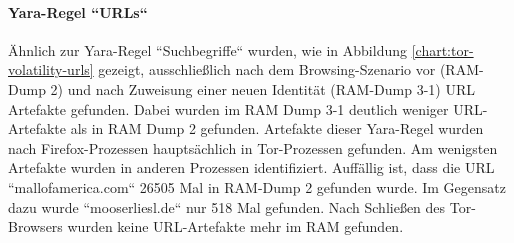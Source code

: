 \paragraph*{Yara-Regel ``URLs``}
Ähnlich zur Yara-Regel ``Suchbegriffe`` wurden, wie in Abbildung \ref{chart:tor-volatility-urls} gezeigt, ausschließlich nach dem Browsing-Szenario vor (RAM-Dump 2) und nach Zuweisung einer neuen Identität (RAM-Dump 3-1) URL Artefakte gefunden. Dabei wurden im RAM Dump 3-1 deutlich weniger URL-Artefakte als in RAM Dump 2 gefunden. 
Artefakte dieser Yara-Regel wurden nach Firefox-Prozessen hauptsächlich in Tor-Prozessen gefunden. Am wenigsten Artefakte wurden in anderen Prozessen identifiziert.
Auffällig ist, dass die URL ``mallofamerica.com`` 26505 Mal in RAM-Dump 2 gefunden wurde. Im Gegensatz dazu wurde ``mooserliesl.de`` nur 518 Mal gefunden. Nach Schließen des Tor-Browsers wurden keine URL-Artefakte mehr im RAM gefunden.
